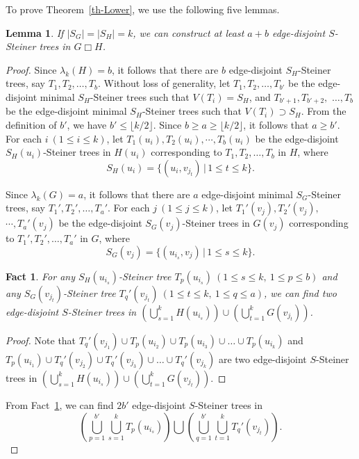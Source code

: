 \documentclass[final]{dmtcs-episciences}
\newtheorem{lemma}{Lemma}[section]
\newtheorem{fact}{Fact}
\begin{document}
To prove Theorem~\ref{th-Lower}, we use the following five lemmas.
\begin{lemma}\label{lem2-1}
If $|S_G|=|S_H|=k$, we can construct at least $a+b$
edge-disjoint $S$-Steiner trees in $G\Box H$.
\end{lemma}
\begin{proof}
Since $\lambda_k(H)=b$, it follows that there are $b$ edge-disjoint
$S_H$-Steiner trees, say $T_1, T_2,\ldots, T_b$. Without loss of
generality, let $T_1, T_2,\ldots, T_{b'}$ be the edge-disjoint
minimal $S_H$-Steiner trees such that $V(T_i)=S_H$, and $T_{b'+1},
T_{b'+2},$ $\ldots, T_{b}$ be the edge-disjoint minimal
$S_H$-Steiner trees such that $V(T_i)\supset S_H$. From the definition
of $b'$, we have $b'\leq \lfloor k/2\rfloor$. Since $b\geq a\geq
\lfloor k/2\rfloor$, it follows that $a\geq b'$. For each $i \
(1\leq i\leq k)$, let $T_1(u_i), T_2(u_i), \cdots, T_{b}(u_i)$ be
the edge-disjoint $S_H(u_i)$-Steiner trees in $H(u_i)$ corresponding
to $T_1, T_2,\ldots, T_{b}$ in $H$, where
\[
S_H(u_i)=\{(u_i,v_{j_t})\,|\,1\leq t\leq k\}.
\]


Since $\lambda_k(G)=a$, it follows that there are $a$ edge-disjoint
minimal $S_G$-Steiner trees, say $T_1', T_2',\ldots, T_a'$. For each
$j \ (1\leq j\leq k)$, let $T_1'(v_j), T_2'(v_j),$ $ \cdots,
T_{a}'(v_j)$ be the edge-disjoint $S_G(v_j)$-Steiner trees in
$G(v_j)$ corresponding to $T_1', T_2',\ldots, T_{a}'$ in $G$, where
\[
S_G(v_j)=\{(u_{i_s},v_j)\,|\,1\leq s\leq k\}.
\]


\begin{fact}\label{fact1}
For any $S_H(u_{i_s})$-Steiner tree $T_p(u_{i_s}) \ (1\leq s\leq k,
\ 1\leq p\leq b)$ and any $S_G(v_{j_t})$-Steiner tree $T_q'(v_{j_t})
\ (1\leq t\leq k, \ 1\leq q\leq a)$, we can find two edge-disjoint
$S$-Steiner trees in $(\bigcup_{s=1}^kH(u_{i_s}))\cup
(\bigcup_{t=1}^kG(v_{j_t}))$.
\end{fact}
\begin{proof}
Note that $T_q'(v_{j_1})\cup T_p(u_{i_2})\cup T_p(u_{i_3})\cup
\ldots \cup T_p(u_{i_k})$ and $T_p(u_{i_1})\cup T_q'(v_{j_2})\cup
T_q'(v_{j_3})\cup \ldots \cup T_q'(v_{j_k})$ are two edge-disjoint
$S$-Steiner trees in $(\bigcup_{s=1}^kH(u_{i_s}))\cup
(\bigcup_{t=1}^kG(v_{j_t}))$.
\end{proof}


From Fact~\ref{fact1}, we can find $2b'$ edge-disjoint $S$-Steiner
trees in
\[
\left(\bigcup_{p=1}^{b'}\bigcup_{s=1}^kT_p(u_{i_s})\right)\bigcup
\left(\bigcup_{q=1}^{b'}\bigcup_{t=1}^kT_q'(v_{j_t})\right).
\]



\end{proof}
\end{document}

